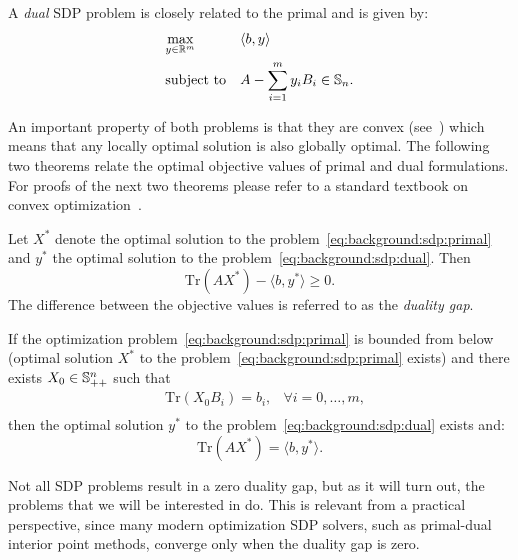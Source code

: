 A \emph{dual} SDP problem is closely related to the primal and is given by:
\begin{equation}\label{eq:background:sdp:dual}
\begin{aligned}
& \underset{y \in \mathbb{R}^m}{\text{max}}
& &  \langle b, y \rangle \\
& \text{subject to}
& &  A - \sum_{i=1}^m y_i B_i \in \mathbb{S}_n.\\
\end{aligned}
\end{equation}

An important property of both problems is that they are convex (see~\cite{Boyd:2004:CO:993483}) which
means that any locally optimal solution is also globally optimal.
The following two theorems relate the optimal objective values of primal and dual formulations. For proofs
of the next two theorems please refer to a standard textbook on convex optimization~\cite{Boyd:2004:CO:993483}.

\begin{theorem}\label{thm:background:sdp_weak}
Let $X^*$ denote the optimal solution to the problem~\ref{eq:background:sdp:primal} and $y^*$ the optimal
solution to the problem~\ref{eq:background:sdp:dual}. Then
$$ \mathrm{Tr}(A X^*) - \langle b, y^* \rangle \geq 0.$$
The difference between the objective values is referred to as the \emph{duality gap}.
\end{theorem}

\begin{theorem}\label{thm:background:sdp_strong}
If the optimization problem~\ref{eq:background:sdp:primal} is bounded from below 
(optimal solution $X^*$ to the problem~\ref{eq:background:sdp:primal} exists) and there exists $X_0 \in \mathbb{S}_{++}^n$
such that 
\begin{equation}
\begin{aligned}
& \mathrm{Tr}(X_0 B_i) = b_i, & \forall i = 0,\ldots,m, \\
\end{aligned}
\end{equation}
then the optimal solution $y^*$ to the problem~\ref{eq:background:sdp:dual} exists and:
$$ \mathrm{Tr}(A X^*) = \langle b, y^* \rangle.$$
\end{theorem}

Not all SDP problems result in a zero duality gap, but as it will turn out, the problems that we will be interested in do. This
is relevant from a practical perspective, since many modern optimization SDP solvers,
such as primal-dual interior point methods, converge only when the duality gap is zero.


